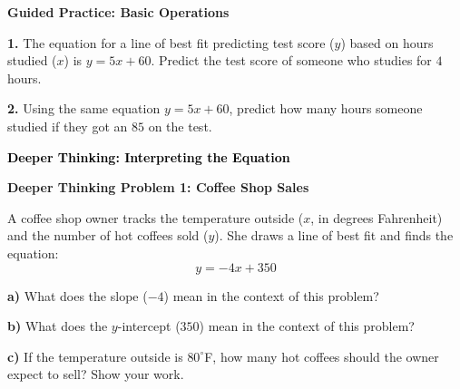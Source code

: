 \documentclass[12pt, letterpaper, fleqn]{article}
\begin{document}
\begin{tcolorbox}[colback=white!15, colframe=black, boxrule=1.5pt, arc=4mm, left=6mm, right=6mm, top=5mm, bottom=5mm]

\textbf{Guided Practice: Basic Operations}

\medskip

\noindent
\textbf{1.} The equation for a line of best fit predicting test score ($y$) based on hours studied ($x$) is $y = 5x + 60$. Predict the test score of someone who studies for $4$ hours.
\vspace{2.5cm}

\noindent
\textbf{2.} Using the same equation $y = 5x + 60$, predict how many hours someone studied if they got an $85$ on the test.
\vspace{2.5cm}

\end{tcolorbox}

\newpage

\begin{tcolorbox}[colback=customteal!20]
\large\textcolor{black}{\textbf{Deeper Thinking: Interpreting the Equation}}
\end{tcolorbox}

\vspace{3mm}

\begin{tcolorbox}[colback=white!15, colframe=black, boxrule=1.5pt, arc=4mm, left=6mm, right=6mm, top=5mm, bottom=5mm]

\textbf{Deeper Thinking Problem 1: Coffee Shop Sales}

\medskip

\noindent
A coffee shop owner tracks the temperature outside ($x$, in degrees Fahrenheit) and the number of hot coffees sold ($y$). She draws a line of best fit and finds the equation:
\[ y = -4x + 350 \]

\vspace{5mm}

\noindent
\textbf{a)} What does the slope ($-4$) mean in the context of this problem?

\vspace{2.5cm}

\noindent
\textbf{b)} What does the $y$-intercept ($350$) mean in the context of this problem?

\vspace{2.5cm}

\noindent
\textbf{c)} If the temperature outside is $80^\circ$F, how many hot coffees should the owner expect to sell? Show your work.

\vspace{3cm}

\end{tcolorbox}
\end{document}
